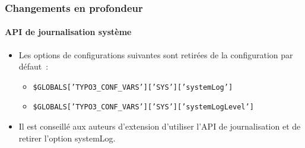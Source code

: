 
\begin{frame}[fragile]
	\frametitle{Changements en profondeur}
	\framesubtitle{API de journalisation système}

	\lstset{basicstyle=\tiny\ttfamily}

	\begin{itemize}
		\item Les options de configurations suivantes sont retirées de la configuration par défaut~:

			\begin{itemize}\smaller
				\item \texttt{\$GLOBALS['TYPO3\_CONF\_VARS']['SYS']['systemLog']}
				\item \texttt{\$GLOBALS['TYPO3\_CONF\_VARS']['SYS']['systemLogLevel']}
			\end{itemize}\normalsize

		\item Il est conseillé aux auteurs d'extension d'utiliser l'API de journalisation et de retirer
			l'option systemLog.
	\end{itemize}

\end{frame}


